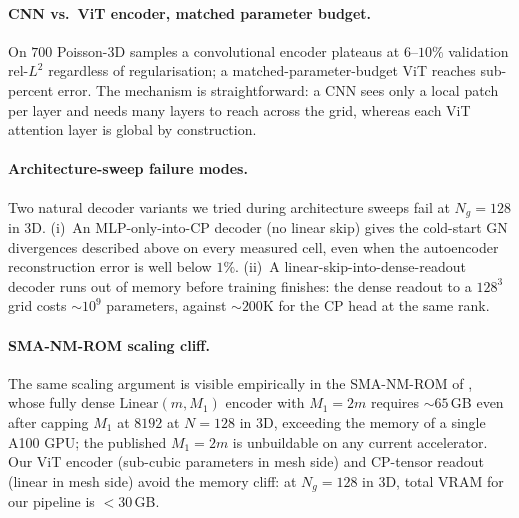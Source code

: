 \documentclass{article}
\begin{document}
\paragraph{CNN vs.\ ViT encoder, matched parameter budget.}
On $700$ Poisson-3D samples a convolutional encoder plateaus at
$6$--$10\%$ validation rel-$L^2$ regardless of regularisation; a
matched-parameter-budget ViT reaches sub-percent error. The mechanism
is straightforward: a CNN sees only a local patch per layer and needs
many layers to reach across the grid, whereas each ViT attention
layer is global by construction.

\paragraph{Architecture-sweep failure modes.}
Two natural decoder variants we tried during architecture sweeps fail
at $N_g = 128$ in 3D. (i)~An MLP-only-into-CP decoder (no linear skip)
gives the cold-start GN divergences described above on every measured
cell, even when the autoencoder reconstruction error is well below
$1\%$. (ii)~A linear-skip-into-dense-readout decoder runs out of
memory before training finishes: the dense readout to a $128^3$ grid
costs $\sim$$10^9$ parameters, against $\sim$$200$K for the CP head at
the same rank.

\paragraph{SMA-NM-ROM scaling cliff.}
The same scaling argument is visible empirically in the SMA-NM-ROM of
\citet{KimChoi2022NMROM}, whose fully dense $\mathrm{Linear}(m, M_1)$
encoder with $M_1 = 2 m$ requires $\sim 65$\,GB even after capping
$M_1$ at $8192$ at $N = 128$ in 3D, exceeding the memory of a single
A100 GPU; the published $M_1 = 2 m$ is unbuildable on any current
accelerator. Our ViT encoder (sub-cubic parameters in mesh side) and
CP-tensor readout (linear in mesh side) avoid the memory cliff: at
$N_g = 128$ in 3D, total VRAM for our pipeline is $< 30$\,GB.

\newpage

\end{document}

